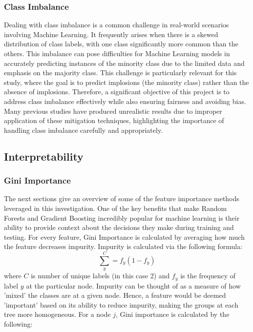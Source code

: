 \documentclass[a4paper]{report}
\begin{document}
\subsubsection{Class Imbalance}
Dealing with class imbalance is a common challenge in real-world scenarios involving Machine Learning. It frequently arises when there is a skewed distribution of class labels, with one class significantly more common than the others. 
This imbalance can pose difficulties for Machine Learning models in accurately predicting instances of the minority class due to the limited data and emphasis on the majority class. This challenge is particularly relevant for this study,
where the goal is to predict implosions (the minority class) rather than the absence of implosions.
Therefore, a significant objective of this project is to address class imbalance effectively while also ensuring fairness and avoiding bias. 
Many previous studies have produced unrealistic results due to improper application of these mitigation techniques, highlighting the importance of handling class imbalance carefully and appropriately.

\subsection{Interpretability}

\subsubsection{Gini Importance}
The next sections give an overview of some of the feature importance methods leveraged in this investigation.
One of the key benefits that make Random Forests and Gradient Boosting incredibly popular for machine learning is their ability to provide context about the decisions they make 
during training and testing. For every feature, Gini Importance is calculated by averaging how much the feature decreases impurity. Impurity is calculated via the following formula:
\begin{equation}
  \sum_{y}^{C} = f_y(1-f_y)
\end{equation}
where \(C\) is number of unique labels (in this case 2) and \(f_y\) is the frequency of label \(y\) at the particular node. Impurity can 
be thought of as a measure of how 'mixed' the classes are at a given node. Hence, a feature would be deemed 'important' based on its 
ability to reduce impurity, making the groups at each tree more homogeneous. For a node \(j\), Gini importance is calculated by the following:
\end{document}
